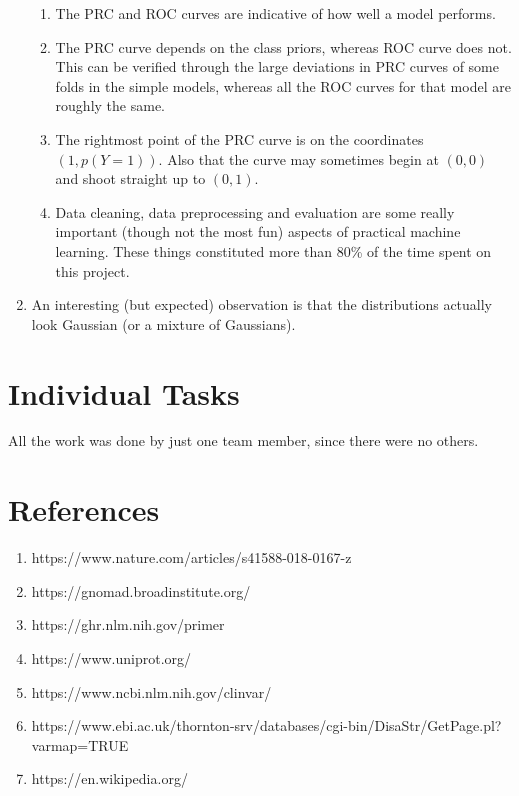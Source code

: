 \documentclass[twoside]{article}
\begin{document}
\begin{enumerate}
		\begin{enumerate}
			\item The PRC and ROC curves are indicative of how well a model performs.
			\item The PRC curve depends on the class priors, whereas ROC curve does not. This can be verified through the large deviations in PRC curves of some folds in the simple models, whereas all the ROC curves for that model are roughly the same.
			\item The rightmost point of the PRC curve is on the coordinates $(1, p(Y=1))$. Also that the curve may sometimes begin at $(0,0)$ and shoot straight up to $(0,1)$.
			\item Data cleaning, data preprocessing and evaluation are some really important (though not the most fun) aspects of practical machine learning. These things constituted more than 80\% of the time spent on this project.
		\end{enumerate}
	\item An interesting (but expected) observation is that the distributions actually look Gaussian (or a mixture of Gaussians).
	\end{enumerate}
	
	
	\newpage
	
	\section{Individual Tasks}
	All the work was done by just one team member, since there were no others.
	
	
	
	\section{References}
	\begin{enumerate}
		\item https://www.nature.com/articles/s41588-018-0167-z
		\item https://gnomad.broadinstitute.org/
		\item https://ghr.nlm.nih.gov/primer
		\item https://www.uniprot.org/
		\item https://www.ncbi.nlm.nih.gov/clinvar/
		\item https://www.ebi.ac.uk/thornton-srv/databases/cgi-bin/DisaStr/GetPage.pl?varmap=TRUE
		\item https://en.wikipedia.org/
	\end{enumerate}
	
	
\end{document}
